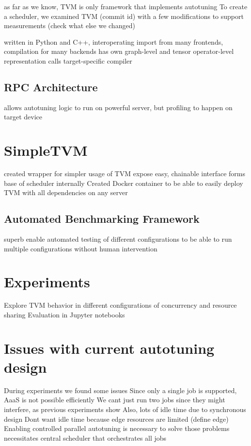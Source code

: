 as far as we know, TVM is only framework that implements autotuning
To create a scheduler, we examined TVM (commit id) with a few modifications to support measurements (check what else we changed)

written in Python and C++, interoperating
import from many frontends, compilation for many backends
has own graph-level and tensor operator-level representation
calls target-specific compiler

\subsection{RPC Architecture}
allows autotuning logic to run on powerful server, but profiling to happen on target device

\section{SimpleTVM}
created wrapper for simpler usage of TVM
expose easy, chainable interface
forms base of scheduler internally
Created Docker container to be able to easily deploy TVM with all dependencies on any server

\subsection{Automated Benchmarking Framework}
superb
enable automated testing of different configurations to be able to run multiple configurations without human intervention

\section{Experiments}
Explore TVM behavior in different configurations of concurrency and resource sharing
Evaluation in Jupyter notebooks

\section{Issues with current autotuning design}
During experiments we found some issues
Since only a single job is supported, AaaS is not possible efficiently
We cant just run two jobs since they might interfere, as previous experiments show
Also, lots of idle time due to synchronous design
Dont want idle time because edge resources are limited (define edge)
Enabling controlled parallel autotuning is necessary to solve those problems
necessitates central scheduler that orchestrates all jobs